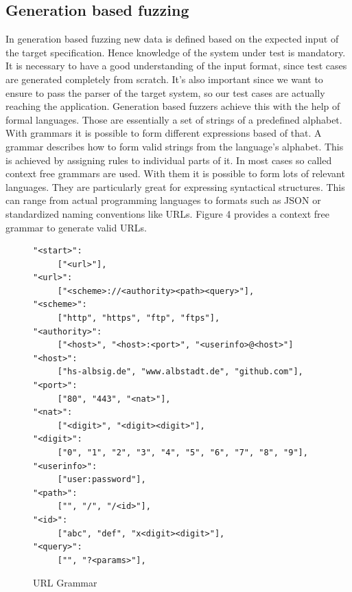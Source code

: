 \documentclass[journal=tosc,final]{iacrtrans}
\begin{document}
\subsection{Generation based fuzzing}
In generation based fuzzing new data is defined based on the expected input of the target specification. Hence knowledge of the system under test is mandatory. It is necessary to have a good understanding of the input format, since test cases are generated completely from scratch. It's also important since we want to ensure to pass the parser of the target system, so our test cases are actually reaching the application.
Generation based fuzzers achieve this with the help of formal languages. Those are essentially a set of strings of a predefined alphabet. With grammars it is possible to form different expressions based of that. A grammar describes how to form valid strings from the language's alphabet. This is achieved by assigning rules to individual parts of it.
In most cases so called context free grammars are used. With them it is possible to form lots of relevant languages. They are particularly great for expressing syntactical structures. This can range from actual programming languages to formats such as JSON or standardized naming conventions like URLs. Figure 4 provides a context free grammar to generate valid URLs.
\begin{figure}[h]
 \caption{URL Grammar}
 \begin{center}
\begin{shaded}
\begin{internallinenumbers}
\begin{verbatim}
"<start>":
     ["<url>"],
"<url>":
     ["<scheme>://<authority><path><query>"],
"<scheme>":
     ["http", "https", "ftp", "ftps"],
"<authority>":
     ["<host>", "<host>:<port>", "<userinfo>@<host>"]
"<host>":  
     ["hs-albsig.de", "www.albstadt.de", "github.com"],
"<port>":
     ["80", "443", "<nat>"],
"<nat>":
     ["<digit>", "<digit><digit>"],
"<digit>":
     ["0", "1", "2", "3", "4", "5", "6", "7", "8", "9"],
"<userinfo>":  
     ["user:password"],
"<path>":  
     ["", "/", "/<id>"],
"<id>":  
     ["abc", "def", "x<digit><digit>"],
"<query>":
     ["", "?<params>"],
\end{verbatim}
\end{internallinenumbers}
\end{shaded}
\end{center}

\end{figure}
\end{document}
